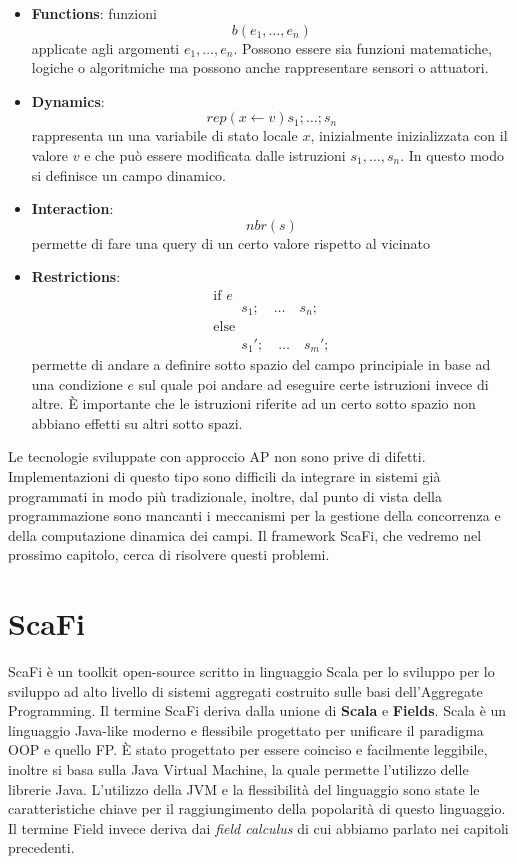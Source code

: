 \documentclass[12pt,a4paper,openright,twoside]{book}
\begin{document}
\begin{itemize}
    \item \textbf{Functions}: funzioni $$ b(e_1,\dots,e_n) $$ applicate agli argomenti $e_1,\dots,e_n$. Possono essere sia funzioni matematiche, logiche o algoritmiche ma possono anche rappresentare sensori o attuatori.
    \item \textbf{Dynamics}: $$ rep(x \leftarrow v){s_1;\dots;s_n} $$ rappresenta un una variabile di stato locale $x$, inizialmente inizializzata con il valore $v$ e che può essere modificata dalle istruzioni $s_1,\dots,s_n$. In questo modo si definisce un campo dinamico.
    \item \textbf{Interaction}: $$ nbr(s) $$ permette di fare una query di un certo valore rispetto al vicinato 
    \item \textbf{Restrictions}: $$
        \begin{array}{l}
        \text{if } e \\
        \qquad s_1; \quad \dots \quad s_n; \\
        \text{else} \\
        \qquad s_1'; \quad \dots \quad s_m';
        \end{array}
    $$
    permette di andare a definire sotto spazio del campo principiale in base ad una condizione $e$ sul quale poi andare ad eseguire certe istruzioni invece di altre. È importante che le istruzioni riferite ad un certo sotto spazio non abbiano effetti su altri sotto spazi.
\end{itemize}

Le tecnologie sviluppate con approccio \ac{AP} non sono prive di difetti. 
Implementazioni di questo tipo sono difficili da integrare in sistemi già programmati in modo più tradizionale, inoltre, dal punto di vista della programmazione sono mancanti i meccanismi per la gestione della concorrenza e della computazione dinamica dei campi. Il framework ScaFi, che vedremo nel prossimo capitolo, cerca di risolvere questi problemi.


\section{ScaFi}

ScaFi è un toolkit open-source scritto in linguaggio Scala per lo sviluppo per lo sviluppo ad alto livello di sistemi aggregati costruito sulle basi dell'Aggregate Programming.
Il termine ScaFi deriva dalla unione di \textbf{Scala} e \textbf{Fields}. Scala è un linguaggio Java-like moderno e flessibile progettato per unificare il paradigma \ac{OOP} e quello \ac{FP}. È stato progettato per essere coinciso e facilmente leggibile, inoltre si basa sulla Java Virtual Machine, la quale permette l'utilizzo delle librerie Java. L'utilizzo della JVM e la flessibilità del linguaggio sono state le caratteristiche chiave per il raggiungimento della popolarità di questo linguaggio. Il termine Field invece deriva dai \textit{field calculus} di cui abbiamo parlato nei capitoli precedenti.
\end{document}
